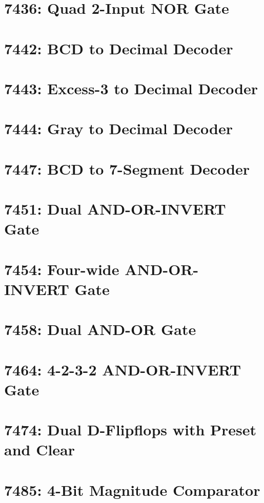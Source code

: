 \section{7436: Quad 2-Input NOR Gate}

\section{7442: BCD to Decimal Decoder}

\section{7443: Excess-3 to Decimal Decoder}

\section{7444: Gray to Decimal Decoder}

\section{7447: BCD to 7-Segment Decoder}

\section{7451: Dual AND-OR-INVERT Gate}

\section{7454: Four-wide AND-OR-INVERT Gate}

\section{7458: Dual AND-OR Gate}

\section{7464: 4-2-3-2 AND-OR-INVERT Gate}

\section{7474: Dual D-Flipflops with Preset and Clear}

\section{7485: 4-Bit Magnitude Comparator}

